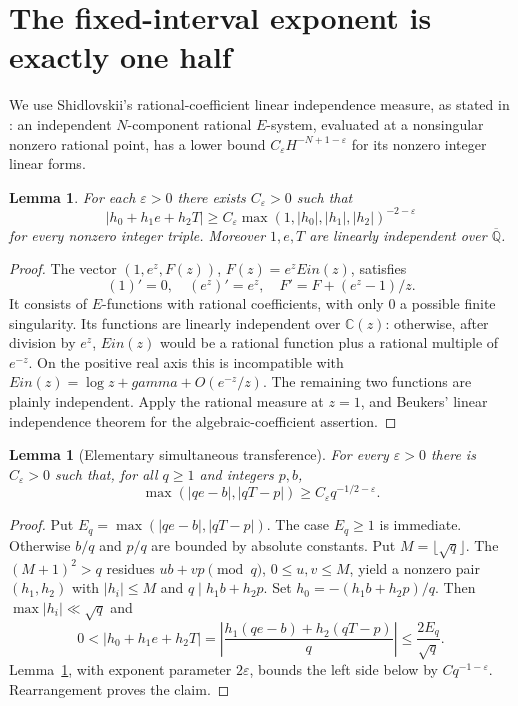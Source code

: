 \documentclass[11pt,a4paper]{article}
\newcommand{\C}{\mathbb C}
\newcommand{\QB}{\overline{\mathbb Q}}
\DeclareMathOperator{\Ein}{Ein}
\newtheorem{lemma}[theorem]{Lemma}
\theoremstyle{definition}
\theoremstyle{remark}
\theoremstyle{plain}
\numberwithin{equation}{section}
\def\Ein{Ein}\def\gamma{gamma}\def\delta{delta}\def\eta{eta}%
\begin{document}
\section{The fixed-interval exponent is exactly one half}
We use Shidlovskii's rational-coefficient linear independence measure, as stated in \cite[Theorem A]{FRliouville}: an independent $N$-component rational $E$-system, evaluated at a nonsingular nonzero rational point, has a lower bound $C_\varepsilon H^{-N+1-\varepsilon}$ for its nonzero integer linear forms.

\begin{lemma}\label{ra:lem:engine}
For each $\varepsilon>0$ there exists $C_\varepsilon>0$ such that
\[
 |h_0+h_1e+h_2T|\ge C_\varepsilon\max(1,|h_0|,|h_1|,|h_2|)^{-2-\varepsilon}
\]
for every nonzero integer triple. Moreover $1,e,T$ are linearly independent over $\QB$.
\end{lemma}
\begin{proof}
The vector $(1,e^z,F(z))$, $F(z)=e^z\Ein(z)$, satisfies
\[
 (1)'=0,\quad (e^z)'=e^z,\quad F'=F+(e^z-1)/z.
\]
It consists of $E$-functions with rational coefficients, with only $0$ a possible finite singularity. Its functions are linearly independent over $\C(z)$: otherwise, after division by $e^z$, $\Ein(z)$ would be a rational function plus a rational multiple of $e^{-z}$. On the positive real axis this is incompatible with $\Ein(z)=\log z+\gamma+O(e^{-z}/z)$. The remaining two functions are plainly independent. Apply the rational measure at $z=1$, and Beukers' linear independence theorem \cite{Beukers} for the algebraic-coefficient assertion.
\end{proof}

\begin{lemma}[Elementary simultaneous transference]\label{ra:lem:transfer}
For every $\varepsilon>0$ there is $C_\varepsilon>0$ such that, for all $q\ge1$ and integers $p,b$,
\begin{equation}\label{ra:eq:sim}
 \max(|qe-b|,|qT-p|)\ge C_\varepsilon q^{-1/2-\varepsilon}.
\end{equation}
\end{lemma}
\begin{proof}
Put $E_q=\max(|qe-b|,|qT-p|)$. The case $E_q\ge1$ is immediate. Otherwise $b/q$ and $p/q$ are bounded by absolute constants. Put $M=\lfloor\sqrt q\rfloor$. The $(M+1)^2>q$ residues $ub+vp\pmod q$, $0\le u,v\le M$, yield a nonzero pair $(h_1,h_2)$ with $|h_i|\le M$ and $q\mid h_1b+h_2p$. Set $h_0=-(h_1b+h_2p)/q$. Then $\max|h_i|\ll\sqrt q$ and
\[
 0<|h_0+h_1e+h_2T|
 =\left|\frac{h_1(qe-b)+h_2(qT-p)}q\right|
 \le \frac{2E_q}{\sqrt q}.
\]
Lemma~\ref{ra:lem:engine}, with exponent parameter $2\varepsilon$, bounds the left side below by $Cq^{-1-\varepsilon}$. Rearrangement proves the claim.
\end{proof}
\end{document}
